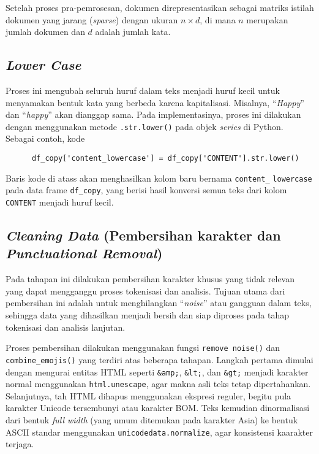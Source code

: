 \documentclass[a4paper,12pt]{report}
\numberwithin{equation}{chapter}
\begin{document}
Setelah proses pra-pemrosesan, dokumen direpresentasikan sebagai matriks istilah dokumen yang jarang (\textit{sparse}) dengan ukuran \(n \times d\), di mana $n$ merupakan jumlah dokumen dan $d$ adalah jumlah kata.


\subsection{\textit{Lower Case}}
Proses ini mengubah seluruh huruf dalam teks menjadi huruf kecil untuk menyamakan bentuk kata yang berbeda karena kapitalisasi. Misalnya, “\textit{Happy}” dan “\textit{happy}” akan dianggap sama. Pada implementasinya, proses ini dilakukan dengan menggunakan metode \texttt{.str.lower()} pada objek \textit{series} di Python. Sebagai contoh, kode 

\begin{verbatim}
      df_copy['content_lowercase'] = df_copy['CONTENT'].str.lower()
\end{verbatim}

Baris kode di atass akan menghasilkan kolom baru bernama \texttt{content\_} \texttt{lowercase} pada data frame \texttt{df\_copy}, yang berisi hasil konversi semua teks dari kolom \texttt{CONTENT} menjadi huruf kecil.

\subsection{ \textit{Cleaning Data} (Pembersihan karakter dan \textit{Punctuational Removal})}
Pada tahapan ini dilakukan pembersihan karakter khusus yang tidak relevan yang dapat mengganggu proses tokenisasi dan analisis.  Tujuan utama dari pembersihan ini adalah untuk menghilangkan ``\textit{noise}'' atau gangguan dalam teks, sehingga data yang dihasilkan menjadi bersih dan siap diproses pada tahap tokenisasi dan analisis lanjutan.

Proses pembersihan dilakukan menggunakan fungsi \texttt{remove noise()} dan \texttt{combine\_emojis()} yang terdiri atas beberapa tahapan. Langkah pertama dimulai dengan mengurai entitas HTML seperti \texttt{\&amp;}, \texttt{\&lt;}, dan \texttt{\&gt;} menjadi karakter normal menggunakan \texttt{html.unescape}, agar makna asli teks tetap dipertahankan. Selanjutnya, tah HTML dihapus menggunakan ekspresi reguler, begitu pula karakter Unicode tersembunyi atau karakter BOM. Teks kemudian dinormalisasi dari bentuk \textit{full width} (yang umum ditemukan pada karakter Asia) ke bentuk ASCII standar menggunakan \texttt{unicodedata.normalize}, agar konsistensi kaarakter terjaga.
\end{document}

